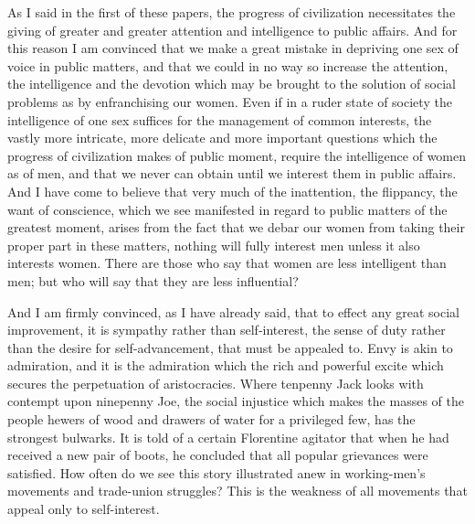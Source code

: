 \documentclass{book}
\begin{document}
As I said in the first of these papers, the progress of civilization necessitates the giving of greater and greater attention and intelligence to public affairs. And for this reason I am convinced that we make a great mistake in depriving one sex of voice in public matters, and that we could in no way so increase the attention, the intelligence and the devotion which may be brought to the solution of social problems as by enfranchising our women. Even if in a ruder state of society the intelligence of one sex suffices for the management of common interests, the vastly more intricate, more delicate and more important questions which the progress of civilization makes of public moment, require the intelligence of women as of men, and that we never can obtain until we interest them in public affairs. And I have come to believe that very much of the inattention, the flippancy, the want of conscience, which we see manifested in regard to public matters of the greatest moment, arises from the fact that we debar our women from taking their proper part in these matters, nothing will fully interest men unless it also interests women. There are those who say that women are less intelligent than men; but who will say that they are less influential?

And I am firmly convinced, as I have already said, that to effect any great social improvement, it is sympathy rather than self-interest, the sense of duty rather than the desire for self-advancement, that must be appealed to. Envy is akin to admiration, and it is the admiration which the rich and powerful excite which secures the perpetuation of aristocracies. Where tenpenny Jack looks with contempt upon ninepenny Joe, the social injustice which makes the masses of the people hewers of wood and drawers of water for a privileged few, has the strongest bulwarks. It is told of a certain Florentine agitator that when he had received a new pair of boots, he concluded that all popular grievances were satisfied. How often do we see this story illustrated anew in working-men’s movements and trade-union struggles? This is the weakness of all movements that appeal only to self-interest.
\end{document}
